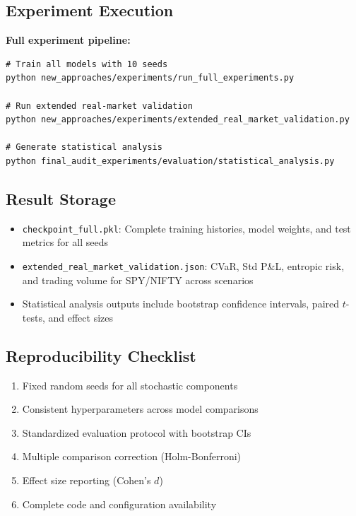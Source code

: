\subsection{Experiment Execution}

\textbf{Full experiment pipeline:}
\begin{verbatim}
# Train all models with 10 seeds
python new_approaches/experiments/run_full_experiments.py

# Run extended real-market validation
python new_approaches/experiments/extended_real_market_validation.py

# Generate statistical analysis
python final_audit_experiments/evaluation/statistical_analysis.py
\end{verbatim}

\subsection{Result Storage}

\begin{itemize}[noitemsep]
    \item \texttt{checkpoint\_full.pkl}: Complete training histories, model weights, and test metrics for all seeds
    \item \texttt{extended\_real\_market\_validation.json}: CVaR, Std P\&L, entropic risk, and trading volume for SPY/NIFTY across scenarios
    \item Statistical analysis outputs include bootstrap confidence intervals, paired $t$-tests, and effect sizes
\end{itemize}

\subsection{Reproducibility Checklist}

\begin{enumerate}[noitemsep]
    \item[\checkmark] Fixed random seeds for all stochastic components
    \item[\checkmark] Consistent hyperparameters across model comparisons
    \item[\checkmark] Standardized evaluation protocol with bootstrap CIs
    \item[\checkmark] Multiple comparison correction (Holm-Bonferroni)
    \item[\checkmark] Effect size reporting (Cohen's $d$)
    \item[\checkmark] Complete code and configuration availability
\end{enumerate}
